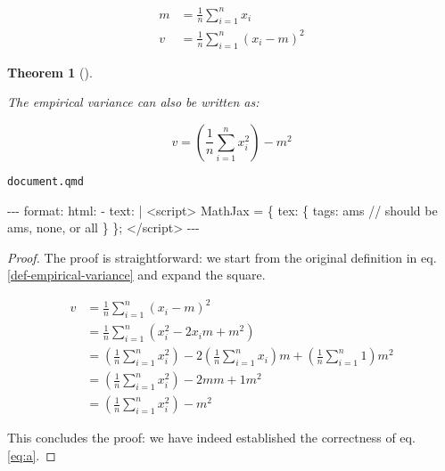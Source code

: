\documentclass[
  letterpaper,
  DIV=11,
  numbers=noendperiod]{scrartcl}
\newenvironment{Shaded}{\begin{snugshade}}{\end{snugshade}}
\newcommand{\AttributeTok}[1]{\textcolor[rgb]{0.40,0.45,0.13}{#1}}
\newcommand{\CharTok}[1]{\textcolor[rgb]{0.13,0.47,0.30}{#1}}
\newcommand{\FunctionTok}[1]{\textcolor[rgb]{0.28,0.35,0.67}{#1}}
\newcommand{\KeywordTok}[1]{\textcolor[rgb]{0.00,0.23,0.31}{#1}}
\newcommand{\NormalTok}[1]{\textcolor[rgb]{0.00,0.23,0.31}{#1}}
\newcommand{\PreprocessorTok}[1]{\textcolor[rgb]{0.68,0.00,0.00}{#1}}
\def\sumi{{\frac{1}{n} \sum_{i=1}^n}}
\theoremstyle{plain}
\newtheorem{theorem}{Theorem}[section]
\theoremstyle{remark}
\begin{document}
\begin{align}
m   &= \sumi x_i \\
v   &= \sumi (x_i - m)^2    \label{def-empirical-variance}
\end{align}

\begin{theorem}[]\protect\hypertarget{thm-label}{}\label{thm-label}

The empirical variance can also be written as:

\begin{equation}
\label{eq:a}
v = (\sumi x_i^2) - m^2
\end{equation}

\end{theorem}

\begin{codelisting}

\caption{\texttt{document.qmd}}

\begin{Shaded}
\begin{Highlighting}[]
\PreprocessorTok{{-}{-}{-}}
\FunctionTok{format}\KeywordTok{:}
\AttributeTok{  }\FunctionTok{html}\KeywordTok{:}
\KeywordTok{        {-} }\FunctionTok{text}\KeywordTok{:}\AttributeTok{ }\CharTok{|}
\NormalTok{            \textless{}script\textgreater{}}
\NormalTok{            MathJax = \{}
\NormalTok{                tex: \{}
\NormalTok{                    tags: \textquotesingle{}ams\textquotesingle{}  // should be \textquotesingle{}ams\textquotesingle{}, \textquotesingle{}none\textquotesingle{}, or \textquotesingle{}all\textquotesingle{}}
\NormalTok{                \}}
\NormalTok{            \};}
\NormalTok{            \textless{}/script\textgreater{}}
\PreprocessorTok{{-}{-}{-}}
\end{Highlighting}
\end{Shaded}

\end{codelisting}

\begin{proof}

The proof is straightforward: we start from the original definition in
eq.\eqref{def-empirical-variance} and expand the square.

\begin{align}
v   &= \sumi (x_i - m)^2 \\
    &= \sumi (x_i^2 - 2 x_i m + m^2) \\
    &= (\sumi x_i^2) - 2 (\sumi x_i) m + (\sumi 1) m^2 \\
    &= (\sumi x_i^2) - 2 m m + 1 m^2 \\
    &= (\sumi x_i^2) - m^2
\end{align}

This concludes the proof: we have indeed established the correctness of
eq.\eqref{eq:a}.

\end{proof}
\end{document}
